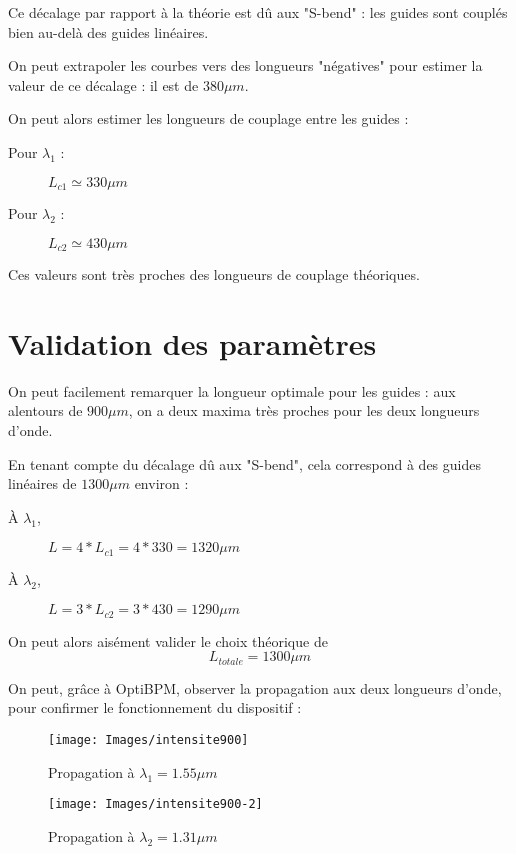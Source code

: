\documentclass[a4paper,11pt]{report}
\begin{document}
Ce décalage par rapport à la théorie est dû aux "S-bend" : les guides sont couplés bien au-delà des guides linéaires.

On peut extrapoler les courbes vers des longueurs "négatives" pour estimer la valeur de ce décalage : il est de $380\mu m$.

On peut alors estimer les longueurs de couplage entre les guides :
\begin{description}
    \item[Pour $\lambda_1$ :] $L_{c1} \simeq 330\mu m$
    \item[Pour $\lambda_2$ :] $L_{c2} \simeq 430\mu m $
\end{description}

Ces valeurs sont très proches des longueurs de couplage théoriques.

\section{Validation des paramètres}
On peut facilement remarquer la longueur optimale pour les guides : aux alentours de $900\mu m$, on a deux maxima très proches pour les deux longueurs d'onde.

En tenant compte du décalage dû aux "S-bend", cela correspond à des guides linéaires de $1300\mu m$ environ :
\begin{description}
    \item[À $\lambda_1$,] $L = 4*L_{c1} = 4*330 = 1320\mu m$
    \item[À $\lambda_2$,] $L = 3*L_{c2} = 3*430 = 1290\mu m$
\end{description}

On peut alors aisément valider le choix théorique de
\[L_{totale} = 1300\mu m\]
\vspace*{2mm}

On peut, grâce à OptiBPM, observer la propagation aux deux longueurs d'onde, pour confirmer le fonctionnement du dispositif :
\begin{figure}[h]
    \begin{center}
        \texttt{[image: Images/intensite900]}
        \caption{Propagation à $\lambda_1=1.55\mu m$}
        \vspace*{1cm}
        \texttt{[image: Images/intensite900-2]}
        \caption{Propagation à $\lambda_2=1.31\mu m$}
        \label{fig:}
    \end{center}
\end{figure}
\end{document}
